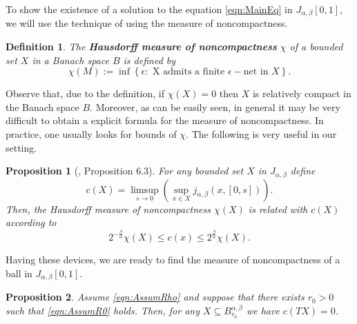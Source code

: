 \documentclass[12pt,a4paper]{article}
\newtheorem{prop}{Proposition}
\newtheorem{df}{Definition}
\begin{document}
To show the existence of a solution to the equation \eqref{eqn:MainEq} in $J_{\alpha,\beta}[0,1]$, we will use the technique of using the measure of noncompactness.
\begin{df}
	The \textbf{Hausdorff measure of noncompactness} $\chi$ of a bounded set $X$ in a Banach space $B$ is defined by
	\begin{equation}
		\chi(M) := \inf\left\{\epsilon: \text{ X admits a finite } \epsilon-\text{net in }X\right\}.
	\end{equation}
\end{df}
Observe that, due to the definition, if $\chi(X) = 0$ then $X$ is relatively compact in the Banach space $B$. Moreover, as can be easily seen, in general it may be very difficult to obtain a explicit formula for the measure of noncompactness. In practice, one usually looks for bounds of $\chi$. The following is very useful in our setting. 
\begin{prop}[\cite{appell2021holder}, Proposition 6.3]
	For any bounded set $X$ in $J_{\alpha, \beta}$ define
	\begin{equation}
		c(X) = \limsup\limits_{s\rightarrow 0} \left(\sup_{x\in X} j_{\alpha,\beta}(x, [0,s])\right).
	\end{equation}
	Then, the Hausdorff measure of noncompactness $\chi(X)$ is related with $c(X)$ according to
	\begin{equation}
		2^{-\frac{\beta}{\alpha}} \chi(X) \leq c(x) \leq 2^\frac{\beta}{\alpha} \chi(X).
	\end{equation}
\end{prop}
Having these devices, we are ready to find the measure of noncompactness of a ball in $J_{\alpha,\beta}[0,1]$.
\begin{prop}\label{prop:Noncompactness}
	Assume \eqref{eqn:AssumRho} and suppose that there exists $r_0 > 0$ such that \eqref{eqn:AssumR0} holds. Then, for any $X\subseteq B_{r_0}^{\alpha,\beta}$ we have $c(T X) = 0$. 
\end{prop}
\end{document}
